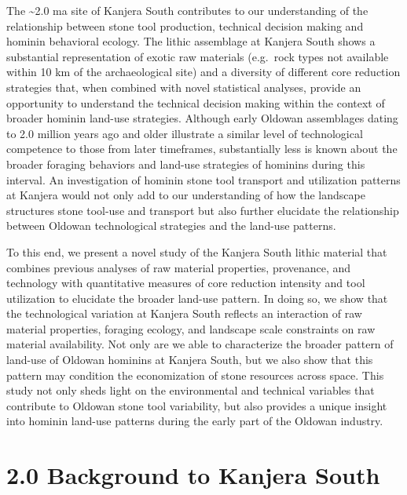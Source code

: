 \documentclass[]{elsarticle} %
\begin{document}
The \textasciitilde{}2.0 ma site of Kanjera South contributes to our
understanding of the relationship between stone tool production,
technical decision making and hominin behavioral ecology. The lithic
assemblage at Kanjera South shows a substantial representation of exotic
raw materials (e.g.~rock types not available within 10 km of the
archaeological site) and a diversity of different core reduction
strategies that, when combined with novel statistical analyses, provide
an opportunity to understand the technical decision making within the
context of broader hominin land-use strategies. Although early Oldowan
assemblages dating to 2.0 million years ago and older illustrate a
similar level of technological competence to those from later
timeframes, substantially less is known about the broader foraging
behaviors and land-use strategies of hominins during this interval. An
investigation of hominin stone tool transport and utilization patterns
at Kanjera would not only add to our understanding of how the landscape
structures stone tool-use and transport but also further elucidate the
relationship between Oldowan technological strategies and the land-use
patterns.

To this end, we present a novel study of the Kanjera South lithic
material that combines previous analyses of raw material properties,
provenance, and technology with quantitative measures of core reduction
intensity and tool utilization to elucidate the broader land-use
pattern. In doing so, we show that the technological variation at
Kanjera South reflects an interaction of raw material properties,
foraging ecology, and landscape scale constraints on raw material
availability. Not only are we able to characterize the broader pattern
of land-use of Oldowan hominins at Kanjera South, but we also show that
this pattern may condition the economization of stone resources across
space. This study not only sheds light on the environmental and
technical variables that contribute to Oldowan stone tool variability,
but also provides a unique insight into hominin land-use patterns during
the early part of the Oldowan industry.

\hypertarget{background-to-kanjera-south}{%
\section{2.0 Background to Kanjera
South}\label{background-to-kanjera-south}}
\end{document}
